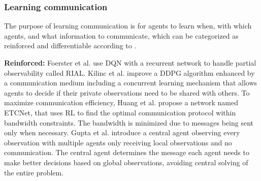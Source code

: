 \documentclass[acmsmall]{acmart}
\begin{document}
\subsubsection{Learning communication}%
The purpose of learning communication is for agents to learn when, with which agents, and what information to communicate, which can be categorized as reinforced and differentiable according to \cite{zhu2022survey}.

\textbf{Reinforced: } 
Foerster et al. \cite{DIAL} use DQN with a recurrent network to handle partial observability called RIAL. %
Kilinc et al. \cite{MADDPG-M} improve a DDPG algorithm enhanced by a communication medium including a concurrent learning mechanism that allows agents to decide if their private observations need to be shared with others. 
To maximize communication efficiency, Huang et al. \cite{ETCNet} propose a network named ETCNet, that uses RL to find the optimal communication protocol within bandwidth constraints. The bandwidth is minimized due to messages being sent only when necessary. 
Gupta et al. \cite{gupta2021hammer} introduce a central agent observing every observation with multiple agents only receiving local observations and no communication. The central agent determines the message each agent needs to make better decisions based on global observations, avoiding central solving of the entire problem.
\end{document}
